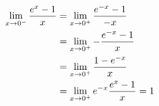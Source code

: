 \documentclass[preview]{standalone}
\begin{document}
\begin{align*}
\special{dvisvgm:raw <g id='unique000'>}\begin{aligned} \special{dvisvgm:raw </g>}\special{dvisvgm:raw <g id='unique001'>}\lim_{x \rightarrow 0^-} \frac{e^x - 1}{x} &= \lim_{x \rightarrow 0^+} \frac{e^{-x} - 1}{-x} \\ \special{dvisvgm:raw </g>}\special{dvisvgm:raw <g id='unique002'>}&= \lim_{x \rightarrow 0^+} -\frac{e^{-x} - 1}{x} \\ \special{dvisvgm:raw </g>}\special{dvisvgm:raw <g id='unique003'>}&= \lim_{x \rightarrow 0^+} \frac{1 - e^{-x}}{x} \\ \special{dvisvgm:raw </g>}\special{dvisvgm:raw <g id='unique004'>}&= \lim_{x \rightarrow 0^+} e^{-x}\frac{e^x - 1}{x} = 1 \special{dvisvgm:raw </g>}\special{dvisvgm:raw <g id='unique005'>}\end{aligned}\special{dvisvgm:raw </g>}
\end{align*}
\end{document}
